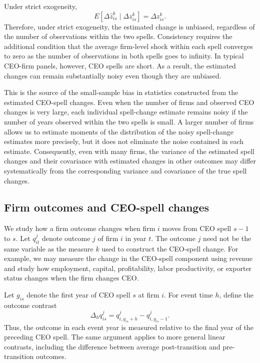 \documentclass[11pt,a4paper]{article}
\begin{document}
Under strict exogeneity,
\begin{equation}
E\!\left[
\Delta\widehat z_{is}^{k}
\mid
\Delta z_{is}^{k}
\right]
=
\Delta z_{is}^{k}.
\label{eq:unbiased_spell_change}
\end{equation}
Therefore, under strict exogeneity, the estimated change is unbiased, regardless of the number of observations within the two spells. Consistency requires the additional condition that the average firm-level shock within each spell converges to zero as the number of observations in both spells goes to infinity. In typical CEO-firm panels, however, CEO spells are short. As a result, the estimated changes can remain substantially noisy even though they are unbiased.

This is the source of the small-sample bias in statistics constructed from the estimated CEO-spell changes. Even when the number of firms and observed CEO changes is very large, each individual spell-change estimate remains noisy if the number of years observed within the two spells is small. A larger number of firms allows us to estimate moments of the distribution of the noisy spell-change estimates more precisely, but it does not eliminate the noise contained in each estimate. Consequently, even with many firms, the variance of the estimated spell changes and their covariance with estimated changes in other outcomes may differ systematically from the corresponding variance and covariance of the true spell changes.


\subsection{Firm outcomes and CEO-spell changes}
\label{subsec:outcomes_spell_changes}

We study how a firm outcome changes when firm $i$ moves from CEO spell
$s-1$ to $s$. Let $q_{it}^{j}$ denote outcome $j$ of firm $i$ in
year $t$. The outcome $j$ need not be the same variable as the measure
$k$ used to construct the CEO-spell change. For example, we may measure
the change in the CEO-spell component using revenue and study how
employment, capital, profitability, labor productivity, or exporter
status changes when the firm changes CEO.

Let $g_{is}$ denote the first year of CEO spell $s$ at firm $i$. For
event time $h$, define the outcome contrast
\begin{equation}
\Delta_h q_{is}^{j}
=
q_{i,g_{is}+h}^{j}
-
q_{i,g_{is}-1}^{j}.
\label{eq:outcome_contrast}
\end{equation}
Thus, the outcome in each event year is measured relative to the final
year of the preceding CEO spell. The same argument applies to more
general linear contrasts, including the difference between average
post-transition and pre-transition outcomes.
\end{document}
